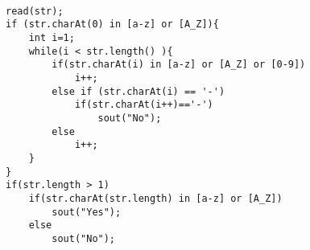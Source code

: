 \begin{center}
\LTR
\begin{lstlisting}

read(str);
if (str.charAt(0) in [a-z] or [A_Z]){
	int i=1;
	while(i < str.length() ){
		if(str.charAt(i) in [a-z] or [A_Z] or [0-9])
			i++;
		else if (str.charAt(i) == '-')
			if(str.charAt(i++)=='-')
				sout("No");
		else
			i++;
	}
}
if(str.length > 1)
	if(str.charAt(str.length) in [a-z] or [A_Z])
		sout("Yes");
	else
		sout("No");
\end{lstlisting}
\end{center}

\pagebreak